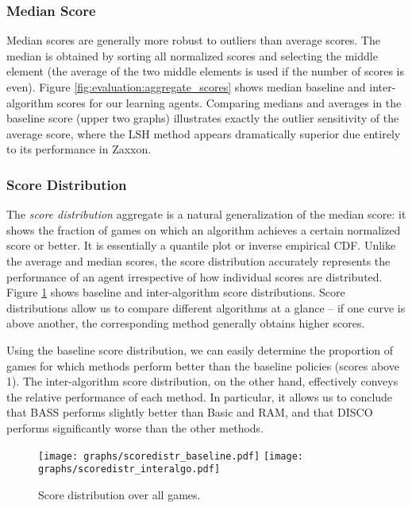\documentclass[twoside,11pt]{article}
\newcommand{\gamename}[1]{{\sc #1}}
\begin{document}
\subsubsection{Median Score}

Median scores are generally more robust to outliers than average scores. The median is obtained by sorting all normalized scores and selecting the middle element (the average of the two middle elements is used if the number of scores is even). Figure \ref{fig:evaluation:aggregate_scores} shows median baseline and inter-algorithm scores for our learning agents.  Comparing medians and averages in the baseline score (upper two graphs) illustrates exactly the outlier sensitivity of the average score, where the LSH method appears dramatically superior due entirely to its performance in \gamename{Zaxxon}.  

\subsubsection{Score Distribution}

The \emph{score distribution} aggregate is a natural generalization of the median score: it shows the fraction of games on which an algorithm achieves a certain normalized score or better.  It is essentially a quantile plot or inverse empirical CDF. Unlike the average and median scores, the score distribution accurately represents the performance of an agent irrespective of how individual scores are distributed. 
Figure \ref{fig:evaluation:score_distribution} shows baseline and inter-algorithm score distributions. 
Score distributions allow us to compare different algorithms at a glance -- if one curve is above another, the corresponding method generally obtains higher scores. 

Using the baseline score distribution, we can easily determine the proportion of games for which methods perform better than the baseline policies (scores above 1). The inter-algorithm score distribution, on the other hand, effectively conveys the relative performance of each method. 
In particular, it allows us to conclude that BASS performs slightly better than Basic and RAM, and that DISCO performs significantly worse than the other methods.


\begin{figure}
\begin{center}
\texttt{[image: graphs/scoredistr\_baseline.pdf]}
\vspace{-2ex}
\texttt{[image: graphs/scoredistr\_interalgo.pdf]}
\caption{Score distribution over all games.\label{fig:evaluation:score_distribution}}
\end{center}
\vspace{-4ex}
\end{figure}
\end{document}
